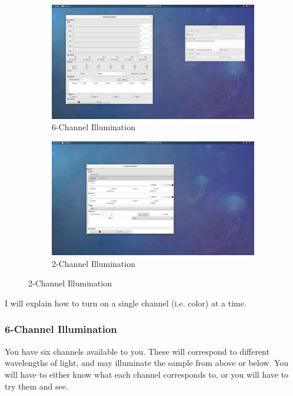 \documentclass{article}
\begin{document}
\begin{figure}[h]
	\begin{subfigure}[b]{0.5\textwidth}
		\includegraphics[width=\textwidth]{illumination}
		\caption{6-Channel Illumination}
	\end{subfigure}
	\begin{subfigure}[b]{0.5\textwidth}
		\includegraphics[width=\textwidth]{illumination_led}
		\caption{2-Channel Illumination}
	\end{subfigure}
\end{figure}

I will explain how to turn on a single channel (i.e. color) at a time. 

\subsubsection{6-Channel Illumination}

You have six channels available to you. These will correspond to different wavelengths of light, and may illuminate the sample from above or below. You will have to either know what each channel corresponds to, or you will have to try them and see.\\
\end{document}
